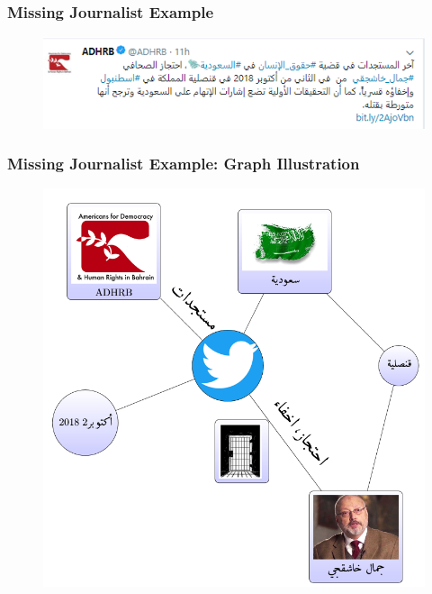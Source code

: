 \documentclass[xcolor=table]{beamer}
\begin{document}
\begin{frame}
\frametitle{Missing Journalist Example }
\begin{figure}[!htb]
   \centering
    \includegraphics[scale=0.55]{img0009.png}
    
\end{figure}

\end{frame}
\begin{frame}
\frametitle{Missing Journalist Example: Graph Illustration}
\begin{figure}[!htb]
   \centering
    \includegraphics[scale=0.38]{graph2.png}
    
\end{figure}

\end{frame}
\end{document}
